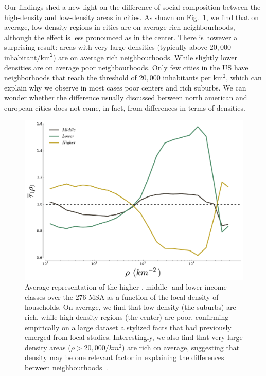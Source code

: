 Our findings shed a new light on the difference of social composition
between the high-density and low-density areas in cities. As shown on
Fig.~\ref{fig:high_low_densities}, we find that on average,
low-density regions in cities are on average rich neighbourhoods,
although the effect is less pronounced as in the center. There is
however a surprising result: areas with very large densities
(typically above $20,000$ inhabitant$/\text{km}^2$) are on average
rich neighbourhoods. While slightly lower densities are on average poor
neighbourhoods. Only few cities in the US have neighborhoods that
reach the threshold of $20,000$ inhabitants per km$^2$, which can
explain why we observe in most cases poor centers and rich suburbs. We
can wonder whether the difference usually discussed between north
american and european cities does not come, in fact, from differences
in terms of densities. 
\begin{figure}
    \centering
    \includegraphics[width=\textwidth]{gfx/chapter-segregation/figure4.pdf}
    \caption{Average representation of the higher-, middle- and
      lower-income classes over the $276$ MSA as a function of the
      local density of households. On average, we find that low-density (the
  suburbs) are rich, while high density regions (the center) are poor,
  confirming empirically on a large dataset a stylized facts that had previously
  emerged from local studies. Interestingly, we also
  find that  very large density areas ($\rho>20,000/km^2$) are rich on average,
  suggesting that density may be one relevant factor in explaining the
  differences between neighbourhoods~\cite{Jacobs:1961}.
  \label{fig:high_low_densities}} 
  \end{figure}

